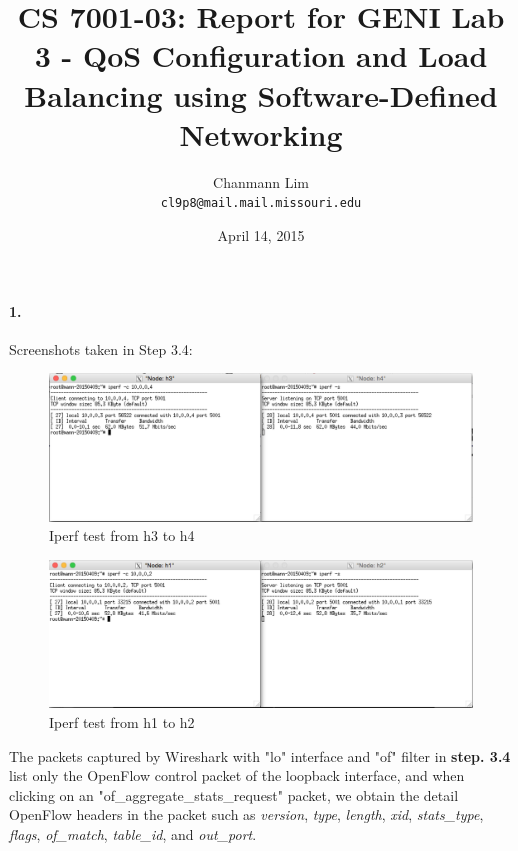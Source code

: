 \documentclass[a4paper]{article}
\begin{document}
\title{CS 7001-03: Report for GENI Lab 3 - QoS Configuration and Load Balancing using Software-Defined Networking}
\author{Chanmann Lim\\ 
	\texttt{cl9p8@mail.mail.missouri.edu}}
\date{April 14, 2015}
\maketitle

\paragraph{1. } Screenshots taken in Step 3.4:
\begin{figure}[H]
  \centering
    \includegraphics[scale=.47]{iperf_h3_h4.png}
  \caption{Iperf test from h3 to h4}
\end{figure}
\begin{figure}[H]
  \centering
    \includegraphics[scale=.47]{iperf_h1_h2.png}
  \caption{Iperf test from h1 to h2}
\end{figure}

The packets captured by Wireshark with "lo" interface and "of" filter in \textbf{step. 3.4} list only the OpenFlow control packet of the loopback interface, and when clicking on an "of\_aggregate\_stats\_request" packet, we obtain the detail OpenFlow headers in the packet such as \emph{version}, \emph{type}, \emph{length}, \emph{xid}, \emph{stats\_type}, \emph{flags}, \emph{of\_match}, \emph{table\_id}, and \emph{out\_port}.
\end{document}
